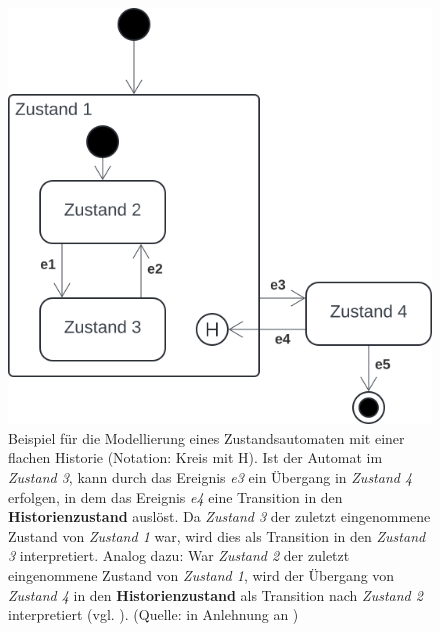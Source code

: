 \begin{figure}
    \centering
    \includegraphics[scale=0.4]{part three/Zustandsautomaten/img/flachehistorie}
    \caption{Beispiel für die Modellierung eines Zustandsautomaten mit einer flachen Historie (Notation: Kreis mit H). Ist der Automat im \textit{Zustand 3}, kann durch das Ereignis \textit{e3} ein Übergang in \textit{Zustand 4} erfolgen, in dem das Ereignis \textit{e4} eine Transition in den \textbf{Historienzustand} auslöst. Da \textit{Zustand 3} der zuletzt eingenommene Zustand von \textit{Zustand 1} war, wird dies als Transition in den \textit{Zustand 3} interpretiert. Analog dazu: War \textit{Zustand 2} der zuletzt eingenommene Zustand von \textit{Zustand 1}, wird der Übergang von \textit{Zustand 4} in den \textbf{Historienzustand} als Transition nach \textit{Zustand 2} interpretiert (vgl. \cite[341 f.]{Bal05}). (Quelle: in Anlehnung an \cite[342, Abb. 6.11-6]{Bal05})}
    \label{fig:flachehistorie}
\end{figure}


